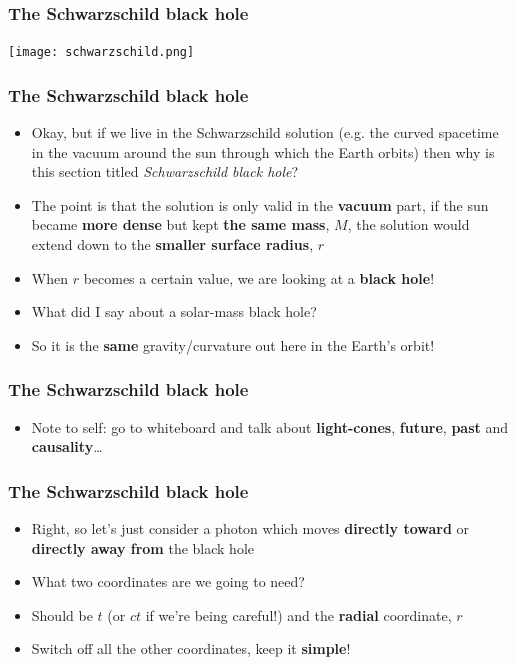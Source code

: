 \documentclass{beamer}
\begin{document}
\begin{frame}
  \center
  \frametitle{The Schwarzschild black hole}
  \texttt{[image: schwarzschild.png]}
\end{frame}

\begin{frame}
  \frametitle{The Schwarzschild black hole}
  \begin{itemize}
    \item<1-> Okay, but if we live in the Schwarzschild solution (e.g. the curved spacetime in the vacuum around the sun through which the Earth orbits) then why is this section titled \textit{Schwarzschild black hole}?
    \item<2-> The point is that the solution is only valid in the \textbf{vacuum} part, if the sun became \textbf{more dense} but kept \textbf{the same mass}, $M$, the solution would extend down to the \textbf{smaller surface radius}, $r$
    \item<3-> When $r$ becomes a certain value, we are looking at a \textbf{black hole}!
    \item<4-> What did I say about a solar-mass black hole?
    \item<5-> So it is the \textbf{same} gravity/curvature out here in the Earth's orbit!
  \end{itemize}
\end{frame}

\begin{frame}
  \frametitle{The Schwarzschild black hole}
  \begin{itemize}
    \item<1-> Note to self: go to whiteboard and talk about \textbf{light-cones}, \textbf{future}, \textbf{past} and \textbf{causality}\ldots
  \end{itemize}
\end{frame}

\begin{frame}
  \frametitle{The Schwarzschild black hole}
  \begin{itemize}
    \item<1-> Right, so let's just consider a photon which moves \textbf{directly toward} or \textbf{directly away from} the black hole
    \item<2-> What two coordinates are we going to need?
    \item<3-> Should be $t$ (or $ct$ if we're being careful!) and the \textbf{radial} coordinate, $r$
    \item<4-> Switch off all the other coordinates, keep it \textbf{simple}!
  \end{itemize}
\end{frame}
\end{document}
